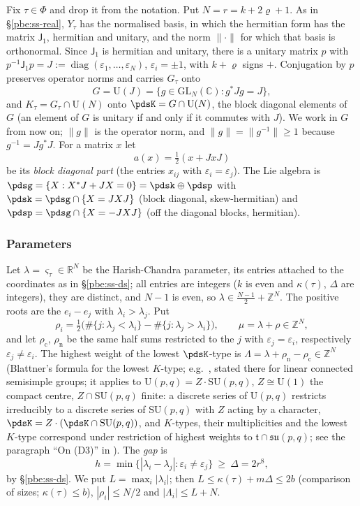 \documentclass[10pt]{amsart}
\theoremstyle{definition}
\theoremstyle{remark}
\newcommand{\C}{\mathbb C}
\newcommand{\R}{\mathbb R}
\newcommand{\Z}{\mathbb Z}
\providecommand{\auPl}{\Phi}
\providecommand{\auU}{\mathrm U}
\begin{document}
Fix $\tau\in\auPl$ and drop it from the notation. Put $N=r=k+2\varrho+1$. As in
\S\ref{pbe:ss-real}, $Y_\tau$ has the normalised basis, in which the hermitian form has the matrix
$\mathsf J_1$, hermitian and unitary, and the norm $\|\cdot\|$ for which that basis is orthonormal.
Since $\mathsf J_1$ is hermitian and unitary, there is a unitary matrix $p$ with $p^{-1}\mathsf J_1p=
J:=\operatorname{diag}(\varepsilon_1,\dots,\varepsilon_N)$, $\varepsilon_i=\pm1$, with $k+\varrho$
signs $+$. Conjugation by $p$ preserves operator norms and carries $G_\tau$ onto
\[
G=\auU(J)=\{g\in\mathrm{GL}_N(\C):g^*Jg=J\},
\]
and $K_\tau=G_\tau\cap\auU(N)$ onto $\pdsK=G\cap\auU(N)$, the block diagonal elements of $G$ (an
element of $G$ is unitary if and only if it commutes with $J$). We work in $G$ from now on;
$\|g\|$ is the operator norm, and $\|g\|=\|g^{-1}\|\ge1$ because $g^{-1}=Jg^*J$. For a matrix $x$ let
\[
a(x)=\tfrac12(x+JxJ)
\]
be its \emph{block diagonal part} (the entries $x_{ij}$ with $\varepsilon_i=\varepsilon_j$). The Lie
algebra is $\pdsg=\{X:X^*J+JX=0\}=\pdsk\oplus\pdsp$ with $\pdsk=\pdsg\cap\{X=JXJ\}$ (block diagonal,
skew-hermitian) and $\pdsp=\pdsg\cap\{X=-JXJ\}$ (off the diagonal blocks, hermitian).

\subsubsection*{Parameters}
Let $\lambda=\varsigma_\tau\in\R^N$ be the Harish-Chandra parameter, its entries attached to the
coordinates as in \S\ref{pbe:ss-ds}; all entries are integers ($k$ is even and $\kappa(\tau)$,
$\Delta$ are integers), they are distinct, and $N-1$ is even, so $\lambda\in\frac{N-1}2+\Z^N$. The
positive roots are the $e_i-e_j$ with $\lambda_i>\lambda_j$. Put
\[
\rho_i=\tfrac12\bigl(\#\{j:\lambda_j<\lambda_i\}-\#\{j:\lambda_j>\lambda_i\}\bigr),\qquad
\mu=\lambda+\rho\in\Z^N,
\]
and let $\rho_{\mathrm c}$, $\rho_{\mathrm n}$ be the same half sums restricted to the $j$ with
$\varepsilon_j=\varepsilon_i$, respectively $\varepsilon_j\ne\varepsilon_i$. The highest weight of the
lowest $\pdsK$-type is $\Lambda=\lambda+\rho_{\mathrm n}-\rho_{\mathrm c}\in\Z^N$ (Blattner's
formula for the lowest $K$-type; e.g.\ \cite[Theorem~9.20(b), p.~310]{Knapp}, stated there for
linear connected semisimple groups; it applies to $\auU(p,q)=Z\cdot\mathrm{SU}(p,q)$, $Z\cong\auU(1)$
the compact centre, $Z\cap\mathrm{SU}(p,q)$ finite: a discrete series of $\auU(p,q)$ restricts
irreducibly to a discrete series of $\mathrm{SU}(p,q)$ with $Z$ acting by a character,
$\pdsK=Z\cdot(\pdsK\cap\mathrm{SU}(p,q))$, and $K$-types, their multiplicities and the lowest $K$-type
correspond under restriction of highest weights to $\mathfrak t\cap\mathfrak{su}(p,q)$; see the
paragraph ``On (D3)'' in {\cite[\S3.1.3]{P49}}). The \emph{gap} is
\[
h=\min\{|\lambda_i-\lambda_j|:\varepsilon_i\ne\varepsilon_j\}\ \ge\ \Delta=2r^8,
\]
by \S\ref{pbe:ss-ds}. We put $L=\max_i|\lambda_i|$; then $L\le\kappa(\tau)+m\Delta\le2b$ (comparison
of sizes; $\kappa(\tau)\le b$), $|\rho_i|\le N/2$ and $|\Lambda_i|\le L+N$.
\end{document}
